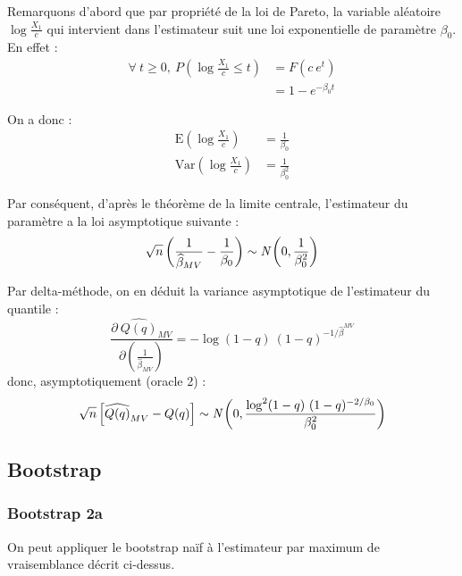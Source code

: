 \documentclass{article}
\renewcommand*{\(}{\left(}
\renewcommand*{\)}{\right)}
\begin{document}
Remarquons d'abord que par propriété de la loi de Pareto, la variable aléatoire $ \log \frac{X_1}{c} $ qui intervient dans l'estimateur suit une loi exponentielle de paramètre $\beta_0$. En effet :
\begin{align*}
\forall\ t \geq 0, \ P(\log \frac{X_1}{c} \leq t) &= F(c \ e^t) \\
&= 1 - e^{-\beta_0 t}
\end{align*}

On a donc :
\begin{align*}
\text{E} \left( \log \frac{X_{1}}{c} \right) &= \frac{1}{\beta_0} \\
\text{Var} \left( \log \frac{X_{1}}{c} \right) &= \frac{1}{\beta_0^2}
\end{align*}

Par conséquent, d'après le théorème de la limite centrale, l'estimateur du paramètre a la loi asymptotique suivante : 
\[ \sqrt{n} \left( \frac{1}{\widehat{\beta}_{MV}} - \frac{1}{\beta_0} \right) \sim \emph{N} \left( 0, \frac{1}{\beta_0^2} \right) \]

Par delta-méthode, on en déduit la variance asymptotique de l'estimateur du quantile :
\[ \frac{\partial \ \widehat{Q(q)}_{MV}} {\partial (\frac{1}{\widehat{\beta}_{MV}}) } = -\log(1-q)\ (1-q)^{-1/\widehat{\beta}^{MV}} \]
donc, asymptotiquement (oracle 2) :
\[ \sqrt{n} \left[ \widehat{Q(q)}_{MV} - Q(q) \right] \sim \emph{N} \left( 0, \frac{\log^2(1-q)\ (1-q)^{-2/\beta_0}}{\beta_0^2}  \right) \]

\subsection{Bootstrap}

\subsubsection{Bootstrap 2a}

On peut appliquer le bootstrap naïf à l'estimateur par maximum de vraisemblance décrit ci-dessus.

\end{document}
